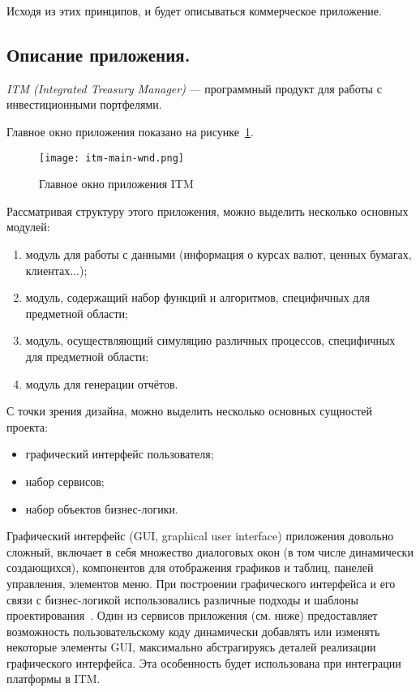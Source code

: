 Исходя из этих принципов, и будет описываться коммерческое приложение.

\subsection{Описание приложения.}

{\it ITM (Integrated Treasury Manager)} --- программный продукт для работы с инвестиционными портфелями. 

Главное окно приложения показано на рисунке~\ref{pic:itm-main-wnd}.
\begin{figure}[!h]
    \centering
    \texttt{[image: itm-main-wnd.png]}
    \caption{Главное окно приложения ITM}
    \label{pic:itm-main-wnd}
\end{figure}

Рассматривая структуру этого приложения, можно выделить несколько основных модулей:
\begin{enumerate}
 \item модуль для работы с данными (информация о курсах валют, ценных бумагах, клиентах...);
 \item модуль, содержащий набор функций и алгоритмов, специфичных для предметной области;
 \item модуль, осуществляющий симуляцию различных процессов, специфичных для предметной области;
 \item модуль для генерации отчётов.
\end{enumerate}

С точки зрения дизайна, можно выделить несколько основных сущностей проекта:
\begin{itemize}
 \item графический интерфейс пользователя; 
 \item набор сервисов;
 \item набор объектов бизнес-логики.
\end{itemize}

Графический интерфейс (GUI, graphical user interface) приложения довольно сложный, включает в себя множество диалоговых окон (в том числе динамически создающихся), компонентов для отображения графиков и таблиц, панелей управления, элементов меню. При построении графического интерфейса и его связи с бизнес-логикой использовались различные подходы и шаблоны проектирования~\cite{band-four}. Один из сервисов приложения (см. ниже) предоставляет возможность пользовательскому коду динамически добавлять или изменять некоторые элементы GUI, максимально абстрагируясь деталей реализации графического интерфейса. Эта особенность будет использована при интеграции платформы в ITM.

